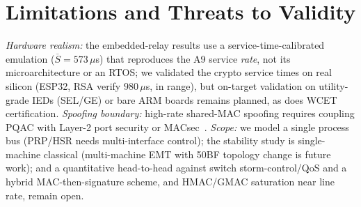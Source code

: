 \documentclass[journal]{IEEEtran}
\begin{document}
\section{Limitations and Threats to Validity}
\label{sec:limitations}
\textit{Hardware realism:} the embedded-relay results use a service-time-calibrated emulation ($\overline{S}=573\,\mu$s) that reproduces the A9 service \emph{rate}, not its microarchitecture or an RTOS; we validated the crypto service times on real silicon (ESP32, RSA verify $980\,\mu$s, in range), but on-target validation on utility-grade IEDs (SEL/GE) or bare ARM boards remains planned, as does WCET certification. \textit{Spoofing boundary:} high-rate shared-MAC spoofing requires coupling PQAC with Layer-2 port security or MACsec~\cite{ieee8021x}. \textit{Scope:} we model a single process bus (PRP/HSR needs multi-interface control); the stability study is single-machine classical (multi-machine EMT with 50BF topology change is future work); and a quantitative head-to-head against switch storm-control/QoS and a hybrid MAC-then-signature scheme, and HMAC/GMAC saturation near line rate, remain open.

\end{document}

